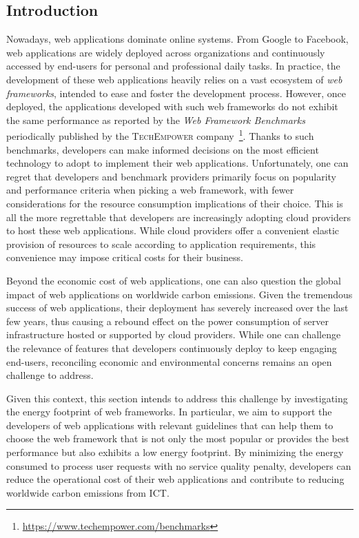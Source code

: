 \subsection{Introduction}
Nowadays, web applications dominate online systems.
From Google to Facebook, web applications are widely deployed across organizations and continuously accessed by end-users for personal and professional daily tasks.
In practice, the development of these web applications heavily relies on a vast ecosystem of \emph{web frameworks}, intended to ease and foster the development process.
However, once deployed, the applications developed with such web frameworks do not exhibit the same performance as reported by the \emph{Web Framework Benchmarks} periodically published by the \textsc{TechEmpower} company~\footnote{\url{https://www.techempower.com/benchmarks}}.
Thanks to such benchmarks, developers can make informed decisions on the most efficient technology to adopt to implement their web applications.
Unfortunately, one can regret that developers and benchmark providers primarily focus on popularity and performance criteria when picking a web framework, with fewer considerations for the resource consumption implications of their choice.
This is all the more regrettable that developers are increasingly adopting cloud providers to host these web applications.
While cloud providers offer a convenient elastic provision of resources to scale according to application requirements, this convenience may impose critical costs for their business.

Beyond the economic cost of web applications, one can also question the global impact of web applications on worldwide carbon emissions.
Given the tremendous success of web applications, their deployment has severely increased over the last few years, thus causing a rebound effect on the power consumption of server infrastructure hosted or supported by cloud providers.
While one can challenge the relevance of features that developers continuously deploy to keep engaging end-users, reconciling economic and environmental concerns remains an open challenge to address.


Given this context, this section intends to address this challenge by investigating the energy footprint of web frameworks.
In particular, we aim to support the developers of web applications with relevant guidelines that can help them to choose the web framework that is not only the most popular or provides the best performance but also exhibits a low energy footprint.
By minimizing the energy consumed to process user requests with no service quality penalty, developers can reduce the operational cost of their web applications and contribute to reducing worldwide carbon emissions from ICT.

